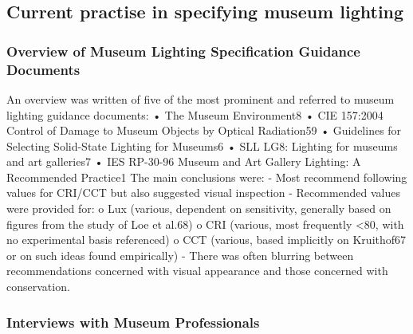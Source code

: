 \subsection{Current practise in specifying museum lighting}

\subsubsection{Overview of Museum Lighting Specification Guidance Documents}

An overview was written of five of the most prominent and referred to museum lighting guidance documents:
•	The Museum Environment8
•	CIE 157:2004 Control of Damage to Museum Objects by Optical Radiation59
•	Guidelines for Selecting Solid-State Lighting for Museums6
•	SLL LG8: Lighting for museums and art galleries7
•	IES RP-30-96 Museum and Art Gallery Lighting: A Recommended Practice1
The main conclusions were:
-	Most recommend following values for CRI/\gls{CCT} but also suggested visual inspection 
-	Recommended values were provided for:
o	Lux (various, dependent on sensitivity, generally based on figures from the study of Loe et al.68)
o	CRI (various, most frequently <80, with no experimental basis referenced)
o	\gls{CCT} (various, based implicitly on Kruithof67 or on such ideas found empirically)
-	There was often blurring between recommendations concerned with visual appearance and those concerned with conservation. 

\subsubsection{Interviews with Museum Professionals}

